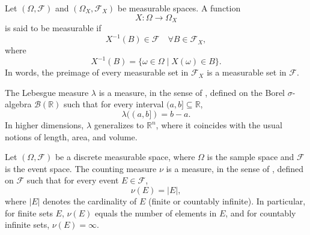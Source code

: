 \begin{definition}
	\label{def:measurable_function}
	Let $(\Omega,\mathcal{F})$ and $(\Omega_X,\mathcal{F}_X)$ be measurable spaces. A function
	\begin{equation}
		X\colon \Omega \to \Omega_X
	\end{equation}
	is said to be measurable if
	\begin{equation}
		X^{-1}(B) \in \mathcal{F} \quad \forall B \in \mathcal{F}_X,
	\end{equation}
	where
	\begin{equation}
		X^{-1}(B) = \{\omega \in \Omega \mid X(\omega) \in B\}.
	\end{equation}
	In words, the preimage of every measurable set in $\mathcal{F}_X$ is a measurable set in $\mathcal{F}$.
\end{definition}

\begin{definition}
	\label{def:lebesgue_measure}
	The Lebesgue measure $\lambda$ is a measure, in the sense of , defined on the Borel $\sigma$-algebra $\mathcal{B}(\mathbb{R})$ such that for every interval $(a,b] \subseteq \mathbb{R}$,
	\begin{equation}
		\lambda((a,b]) = b-a.
	\end{equation}
	In higher dimensions, $\lambda$ generalizes to $\mathbb{R}^n$, where it coincides with the usual notions of length, area, and volume.
\end{definition}

\begin{definition}
	\label{def:counting_measure}
	Let $(\Omega, \mathcal{F})$ be a discrete measurable space, where $\Omega$ is the sample space and $\mathcal{F}$ is the event space. The counting measure $\nu$ is a measure, in the sense of , defined on $\mathcal{F}$ such that for every event $E \in \mathcal{F}$,
	\begin{equation}
		\nu(E) = |E|,
	\end{equation}
	where $|E|$ denotes the cardinality of $E$ (finite or countably infinite). In particular, for finite sets $E$, $\nu(E)$ equals the number of elements in $E$, and for countably infinite sets, $\nu(E) = \infty$.
\end{definition}


